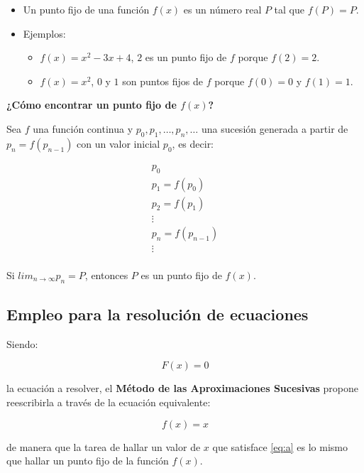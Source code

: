 \documentclass[]{book}
\providecommand{\tightlist}{%
  \setlength{\itemsep}{0pt}\setlength{\parskip}{0pt}}
\begin{document}
\begin{itemize}
\item
  Un punto fijo de una función \(f(x)\) es un número real \(P\) tal que \(f(P)=P\).
\item
  Ejemplos:

  \begin{itemize}
  \tightlist
  \item
    \(f(x)=x^{2}-3x+4\), \(2\) es un punto fijo de \(f\) porque \(f(2) = 2\).
  \item
    \(f(x)=x^{2}\), \(0\) y \(1\) son puntos fijos de \(f\) porque \(f(0) = 0\) y \(f(1) = 1\).
  \end{itemize}
\end{itemize}

\textbf{¿Cómo encontrar un punto fijo de \(f(x)\)?}

Sea \(f\) una función continua y \(p_0, p_1, \dots, p_n, \dots\) una sucesión generada a partir de \(p_{n} = f(p_{n-1})\) con un valor inicial \(p_0\), es decir:

\begin{gather*}
p_0 \\
p_1 = f(p_0) \\
p_2 = f(p_1) \\
\vdots \\
p_n = f(p_{n-1}) \\
\vdots \\
\end{gather*}

Si \(lim_{n\to\infty} p_n = P\), entonces \(P\) es un punto fijo de \(f(x)\).

\hypertarget{empleo-para-la-resoluciuxf3n-de-ecuaciones}{%
\subsection{Empleo para la resolución de ecuaciones}\label{empleo-para-la-resoluciuxf3n-de-ecuaciones}}

Siendo:

\begin{equation}
\label{eq:a}
F(x) = 0
\end{equation}

la ecuación a resolver, el \textbf{Método de las Aproximaciones Sucesivas} propone reescribirla a través de la ecuación equivalente:

\[
f(x) = x
\]

de manera que la tarea de hallar un valor de \(x\) que satisface \eqref{eq:a} es lo mismo que hallar un punto fijo de la función \(f(x)\).
\end{document}
